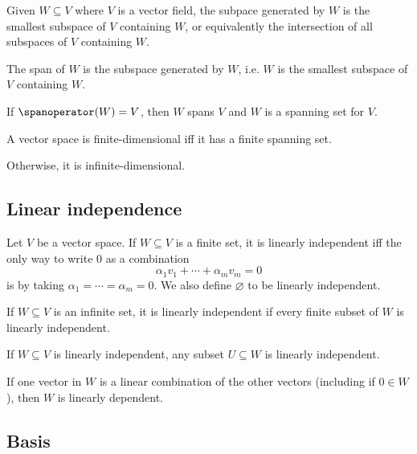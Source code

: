 \begin{definition}
  Given $W \subseteq V$ where $V$ is a vector field, the subpace generated by $W$ is the smallest subspace of $V$ containing $W$, or equivalently the intersection of all subspaces of $V$ containing $W$.
\end{definition}

\begin{theorem}
  The span of $W$ is the subspace generated by $W$, i.e. $W$ is the smallest subspace of $V$ containing $W$.
\end{theorem}

\begin{definition}
  If $\spanoperator(W) = V$, then $W$ spans $V$ and $W$ is a spanning set for $V$.
\end{definition}

\begin{definition}
  A vector space is finite-dimensional iff it has a finite spanning set.

  Otherwise, it is infinite-dimensional.
\end{definition}

\subsection{Linear independence}

\begin{definition}
  Let $V$ be a vector space. If $W \subseteq V$ is a finite set, it is linearly independent iff the only way to write 0 as a combination
  \[
    \alpha_1 v_1 + \cdots + \alpha_m v_m = 0
  \]
  is by taking $\alpha_1 = \cdots = \alpha_m = 0$. We also define $\varnothing$ to be linearly independent.

  If $W \subseteq V$ is an infinite set, it is linearly independent if every finite subset of $W$ is linearly independent.
\end{definition}

\begin{theorem}
  If $W \subseteq V$ is linearly independent, any subset $U \subseteq W$ is linearly independent.

  If one vector in $W$ is a linear combination of the other vectors (including if $0 \in W$), then $W$ is linearly dependent.
\end{theorem}
  
\subsection{Basis}

